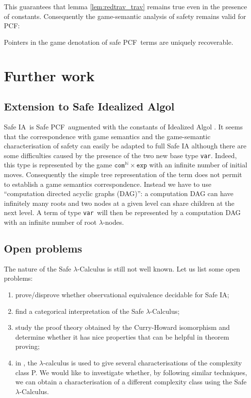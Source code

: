 \documentclass{llncs}
\newcommand\nat{\mathbb{N}}
\newcommand\ialgol{\textsf{IA}}
\newcommand\iacom{\texttt{com}}
\newcommand\iaexp{\texttt{exp}}
\newcommand\iavar{\texttt{var}}
\newcommand\pcf{\textsf{PCF}}
\begin{document}
This guarantees that lemma \ref{lem:redtrav_trav} remains true even in the presence of
constants. Consequently the game-semantic analysis of safety remains valid for \pcf:
\begin{theorem}
Pointers in the game denotation of safe \pcf\ terms are uniquely
recoverable.
\end{theorem}


\section{Further work}

\subsection{Extension to Safe Idealized Algol}

Safe \ialgol\ is Safe \pcf\ augmented with the constants of Idealized Algol
\cite{Reynolds81}. It seems that the correspondence with game semantics and the game-semantic characterisation
of safety can easily be adapted to full Safe \textsf{IA}
although there are some difficulties caused by the presence of the two new
base type \iavar. Indeed, this type is represented by the game $\iacom^{\nat} \times \iaexp$ with an infinite number of
initial moves. Consequently the simple tree representation of the term does not permit to establish a game semantics correspondence.
Instead we have to use ``computation directed acyclic graphs (DAG)'': a computation DAG can
have infinitely many roots and two nodes at a given level can share children at the next level.
A term of type \iavar\ will then be represented by a computation DAG with an infinite number of root $\lambda$-nodes.

\subsection{Open problems}

The nature of the Safe $\lambda$-Calculus is still not well known. Let us list some open problems:
\begin{enumerate}
\item prove/disprove whether observational equivalence decidable for Safe \ialgol;
\item find a categorical interpretation of the Safe $\lambda$-Calculus;
\item study the proof theory obtained by the Curry-Howard isomorphism and determine whether it has nice properties that can be helpful in theorem proving;
\item in \cite{DBLP:conf/tlca/LeivantM93}, the $\lambda$-calculus is used to
give several characterisations of the complexity class P. We would
like to investigate whether, by following similar techniques, we can
obtain a characterisation of a different complexity class using the
Safe $\lambda$-Calculus.
\end{enumerate}
\end{document}
